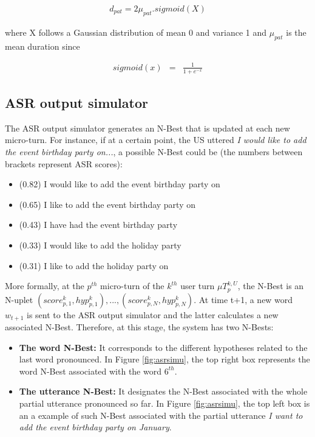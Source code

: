 					\begin{eqnarray}
						d_{pat} = 2 \mu_{pat}.sigmoid(X)
					\end{eqnarray}
					
					where X follows a Gaussian distribution of mean 0 and variance 1 and $\mu_{pat}$ is the mean duration since
					
					\begin{eqnarray}
						sigmoid(x) & = & \frac{1}{1 + e^{-x}}
					\end{eqnarray}
					
					
	\subsection{ASR output simulator}
			
				The ASR output simulator generates an N-Best that is updated at each new micro-turn. For instance, if at a certain point, the US uttered \textit{I would like to add the event birthday party on...}, a possible N-Best could be (the numbers between brackets represent ASR scores):
					
					\begin{itemize}
						\item (0.82) I would like to add the event birthday party on
						\item (0.65) I like to add the event birthday party on
						\item (0.43) I have had the event birthday party
						\item (0.33) I would like to add the holiday party
						\item (0.31) I like to add the holiday party on
					\end{itemize}
					
					More formally, at the $p^{th}$ micro-turn of the $k^{th}$ user turn $\mu T^{k,U}_p$, the N-Best is an N-uplet ${(score^k_{p,1}, hyp^k_{p,1}),...,(score^k_{p,N}, hyp^k_{p,N})}$. At time t+1, a new word $w_{t+1}$ is sent to the ASR output simulator and the latter calculates a new associated N-Best. Therefore, at this stage, the system has two N-Bests:
					
					\begin{itemize}
						\item \textbf{The word N-Best:} It corresponds to the different hypotheses related to the last word pronounced. In Figure \ref{fig:asrsimu}, the top right box represents the word N-Best associated with the word $6^{th}$.
						\item \textbf{The utterance N-Best:} It designates the N-Best associated with the whole partial utterance pronounced so far. In Figure \ref{fig:asrsimu}, the top left box is an a example of such N-Best associated with the partial utterance \textit{I want to add the event birthday party on January}.
					\end{itemize}
					
